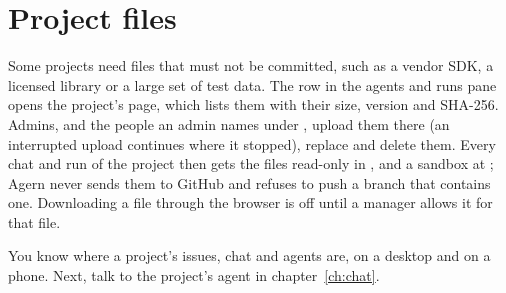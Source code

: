 \section{Project files}\label{sec:project-files}

Some projects need files that must not be committed, such as a vendor SDK, a licensed library or a
large set of test data. The  row in the agents and runs pane opens the project's
 page, which lists them with their size, version and SHA-256. Admins, and the people an
admin names under , upload them there (an interrupted upload continues
where it stopped), replace and delete them. Every chat and run of the project then gets the files
read-only in , and a sandbox at ; Agern never sends
them to GitHub and refuses to push a branch that contains one. Downloading a file through the
browser is off until a manager allows it for that file.

\whatyouhave
You know where a project's issues, chat and agents are, on a desktop and on a phone. Next, talk to
the project's agent in chapter~\ref{ch:chat}.
